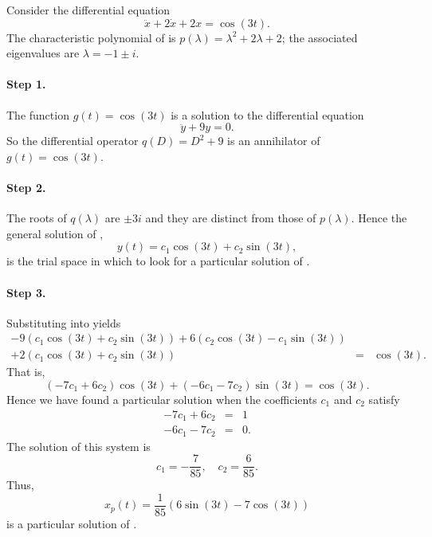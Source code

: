 \documentclass{ximera}
\begin{document}
Consider the differential equation
\begin{equation}  \label{e:undet1}
\ddot x + 2\dot x + 2x = \cos(3t).
\end{equation}
The characteristic polynomial of  is 
$p(\lambda)=\lambda^2+2\lambda+2$; the associated eigenvalues are 
$\lambda=-1\pm i$.

\paragraph{Step 1.} The function $g(t)=\cos(3t)$ is a solution to the 
differential equation
\begin{equation}  \label{e:undet2}
\ddot y + 9y=0.
\end{equation}
So the differential operator $q(D)=D^2+9$ is an 
annihilator of $g(t)=\cos(3t)$. 

\paragraph{Step 2.} The roots of $q(\lambda)$ are $\pm 3i$ and they are 
distinct from those of $p(\lambda)$.  Hence the 
general solution of , 
\begin{equation}   \label{E:undet2}
y(t) = c_1 \cos(3t)+ c_2 \sin(3t),
\end{equation}
is the trial space in which to look for a 
particular solution of .

\paragraph{Step 3.} Substituting  into  yields
\begin{eqnarray*}
-9(c_1\cos(3t)+c_2 \sin(3t)) +6(c_2\cos(3t)-c_1\sin(3t)) & & \\
+2(c_1 \cos(3t)+ c_2 \sin(3t)) &  = & \cos(3t).
\end{eqnarray*}
That is,
\[
(-7c_1+6c_2)\cos(3t)+(-6c_1-7c_2)\sin(3t) = \cos(3t).
\]
Hence we have found a particular solution when the coefficients $c_1$ and 
$c_2$ satisfy 
\begin{eqnarray*}
-7c_1 +6c_2 & = & 1\\
-6c_1 -7c_2 & = & 0.
\end{eqnarray*}
The solution of this system is 
\[
c_1 = -\frac{7}{85},\quad c_2 = \frac{6}{85}.
\]
Thus, 
\[
x_p(t) = \frac{1}{85}(6\sin(3t)-7\cos(3t))
\]
is a particular solution of .
\end{document}
